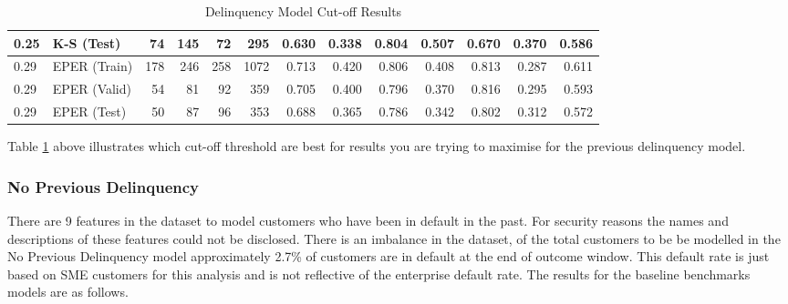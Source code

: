 \begin{table}[H]
{\begin{tabular}{l|l|r|r|r|r|r|r|r|r|r|r|r}
		0.25             & K-S (Test)  & 74          & 145         & 72          & 295         & 0.630             & 0.338              & 0.804        & 0.507           & 0.670                & 0.370  & 0.586     \\ \hline
		0.29             & EPER (Train)          & 178         & 246         & 258         & 1072        & 0.713             & 0.420              & 0.806        & 0.408           & 0.813                & 0.287  & 0.611     \\
		0.29             & EPER (Valid)          & 54          & 81          & 92          & 359         & 0.705             & 0.400              & 0.796        & 0.370           & 0.816                & 0.295    & 0.593   \\
		0.29             & EPER (Test)           & 50          & 87          & 96          & 353         & 0.688             & 0.365              & 0.786        & 0.342           & 0.802                & 0.312  & 0.572    \\ \hline
	\end{tabular}
	}
	\caption{Delinquency Model Cut-off Results }
	\label{table:DelinquencyModelCutoff}
\end{table}

Table \ref{table:DelinquencyModelCutoff} above illustrates which cut-off threshold are best for results you are trying to maximise for the previous delinquency model.

\subsubsection{No Previous Delinquency}

There are 9 features in the dataset to model customers who have been in default in the past. For security reasons the names and descriptions of these features could not be disclosed. There is an imbalance in the dataset, of the total customers to be be modelled in the No Previous Delinquency model approximately 2.7\% of customers are in default at the end of outcome window. This default rate is just based on SME customers for this analysis and is not reflective of the enterprise default rate. The results for the baseline benchmarks models are as follows.

